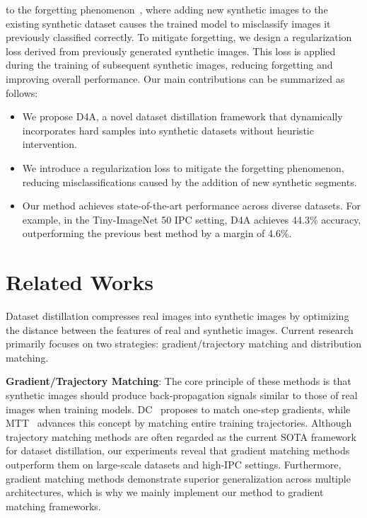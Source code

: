 \documentclass{article}
\theoremstyle{plain}
\theoremstyle{definition}
\theoremstyle{remark}
\begin{document}
to the forgetting phenomenon~\cite{}, where adding new synthetic images to the existing synthetic
dataset causes the trained model to misclassify images it previously classified correctly.
To mitigate forgetting, we design a regularization loss derived from previously generated
synthetic images. This loss is applied during the training of subsequent synthetic images,
reducing forgetting and improving overall performance.
Our main contributions can be summarized as follows:
\begin{itemize}
    \item We propose D4A, a novel dataset distillation framework that dynamically incorporates hard samples into synthetic datasets without heuristic intervention.  
    \item We introduce a regularization loss to mitigate the forgetting phenomenon, reducing misclassifications caused by the addition of new synthetic segments.  
    \item Our method achieves state-of-the-art performance across diverse datasets. For example, in the Tiny-ImageNet 50 IPC setting, D4A achieves 44.3\% accuracy, outperforming the previous best method by a margin of 4.6\%.  
\end{itemize}


\section{Related Works}
Dataset distillation compresses real images into synthetic images by optimizing the distance between the features of real and synthetic images.
Current research primarily focuses on two strategies: gradient/trajectory matching and distribution matching.

\textbf{Gradient/Trajectory Matching}: The core principle of these methods is that synthetic images should produce back-propagation signals similar to those of real images when training models.
DC~\cite{} proposes to match one-step gradients, while MTT~\cite{} advances this concept by matching entire training trajectories.
Although trajectory matching methods are often regarded as the current SOTA framework for dataset distillation, our experiments reveal that gradient matching methods outperform them on large-scale datasets and high-IPC settings.
Furthermore, gradient matching methods demonstrate superior generalization across multiple architectures, which is why we mainly implement our method to gradient matching frameworks.
\end{document}
